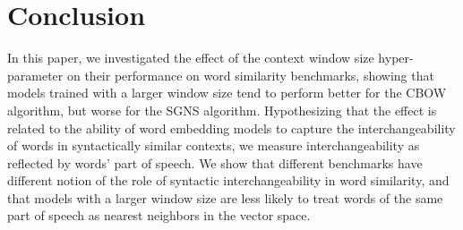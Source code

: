 \documentclass[11pt,a4paper]{article}
\begin{document}
    
    

\section{Conclusion}\label{sec:conclusion}

    In this paper, we investigated the effect of the context window size hyper-parameter
    on their performance on word similarity benchmarks,
    showing that models trained with a larger window size
    tend to perform better for the CBOW algorithm, but worse for the SGNS algorithm.
    Hypothesizing that the effect is related to
    the ability of word embedding models
    to capture the interchangeability of words in syntactically similar contexts,
    we measure interchangeability as reflected by words' part of speech.
    We show that different benchmarks have different notion of the role of
    syntactic interchangeability in word similarity,
    and that models with a larger window size
    are less likely to treat words of the same part of speech as nearest neighbors
    in the vector space.
    
\end{document}
